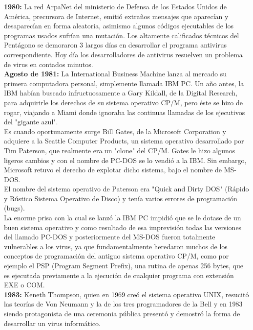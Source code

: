 \documentclass[12pt,a4paper]{article}
\begin{document}
	\textbf{1980:} La red ArpaNet del ministerio de Defensa de los Estados Unidos de América, precursora de Internet, emitió extraños mensajes que aparecían y desaparecían en forma aleatoria, asimismo algunos códigos ejecutables de los programas usados sufrían una mutación. Los altamente calificados técnicos del Pentágono se demoraron 3 largos días en desarrollar el programa antivirus correspondiente. Hoy día los desarrolladores de antivirus resuelven un problema de virus en contados minutos.\\
	
	\textbf{Agosto de 1981:} La International Business Machine lanza al mercado su primera computadora personal, simplemente llamada IBM PC. Un año antes, la IBM habían buscado infructuosamente a Gary Kildall, de la Digital Research, para adquirirle los derechos de su sistema operativo CP/M, pero éste se hizo de rogar, viajando a Miami donde ignoraba las continuas llamadas de los ejecutivos del "gigante azul".\\
	
	Es cuando oportunamente surge Bill Gates, de la Microsoft Corporation y adquiere a la Seattle Computer Products, un sistema operativo desarrollado por Tim Paterson, que realmente era un "clone" del CP/M. Gates le hizo algunos ligeros cambios y con el nombre de PC-DOS se lo vendió a la IBM. Sin embargo, Microsoft retuvo el derecho de explotar dicho sistema, bajo el nombre de MS-DOS.\\
	
	El nombre del sistema operativo de Paterson era "Quick and Dirty DOS" (Rápido y Rústico Sistema Operativo de Disco) y tenía varios errores de programación (bugs).\\
	
	La enorme prisa con la cual se lanzó la IBM PC impidió que se le dotase de un buen sistema operativo y como resultado de esa imprevisión todas las versiones del llamado PC-DOS y posteriormente del MS-DOS fueron totalmente vulnerables a los virus, ya que fundamentalmente heredaron muchos de los conceptos de programación del antiguo sistema operativo CP/M, como por ejemplo el PSP (Program Segment Prefix), una rutina de apenas 256 bytes, que es ejecutada previamente a la ejecución de cualquier programa con extensión EXE o COM.\\
	
	\textbf{1983:} Keneth Thompson, quien en 1969 creó el sistema operativo UNIX, resucitó las teorías de Von Neumann y la de los tres programadores de la Bell y en 1983 siendo protagonista de una ceremonia pública presentó y demostró la forma de desarrollar un virus informático.\\
	
\end{document}
